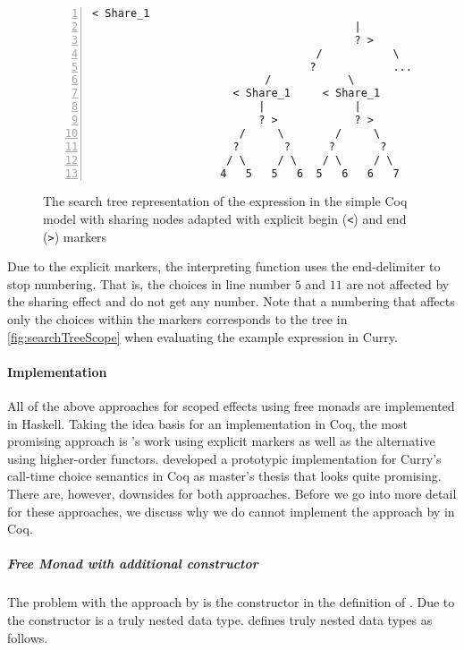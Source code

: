 \begin{figure}[h]
 \centering
\begin{Verbatim}[numbers=left, xleftmargin=5mm]
                                     < Share_1
                                         |
                                         ? >
                                   /           \
                                  ?            ...
                           /            \
                      < Share_1     < Share_1
                          |              |
                          ? >            ? >
                       /     \        /     \
                      ?       ?      ?       ?
                     / \     / \    / \     / \
                    4   5   5   6  5   6   6   7
\end{Verbatim}
\caption{The search tree representation of the expression  in the simple Coq model with sharing nodes adapted with explicit begin (\texttt{<}) and end (\texttt{>}) markers}
\label{fig:searchTreeScope}
\end{figure}

Due to the explicit markers, the interpreting function \cinl{numberChoices} uses the end-delimiter to stop numbering.
That is, the choices in line number $5$ and $11$ are not affected by the sharing effect and do not get any number.
Note that a numbering that affects only the choices within the markers corresponds to the tree in \autoref{fig:searchTreeScope} when evaluating the example expression in Curry.

\paragraph{Implementation}
\label{para:implementationcalltime}

All of the above approaches for scoped effects using free monads are implemented in Haskell.
Taking the idea basis for an implementation in Coq, the most promising approach is \citeauthor{wu2014effect}'s work using explicit markers as well as the alternative using higher-order functors. \citet{bunkenburg2019modeling} developed a prototypic implementation for Curry's call-time choice semantics in Coq as master's thesis that looks quite promising.
There are, however, downsides for both approaches.
Before we go into more detail for these approaches, we discuss why we do cannot implement the approach by \citeauthor{pirog2018syntax} in Coq.

\subparagraph{Free Monad with additional constructor}
The problem with the approach by \citeauthor{pirog2018syntax} is the  constructor in the definition of .
Due to the \hinl{Scope} constructor \hinl{Prog} is a truly nested data type.
\citet{matthes2008recursion} defines truly nested data types as follows.

